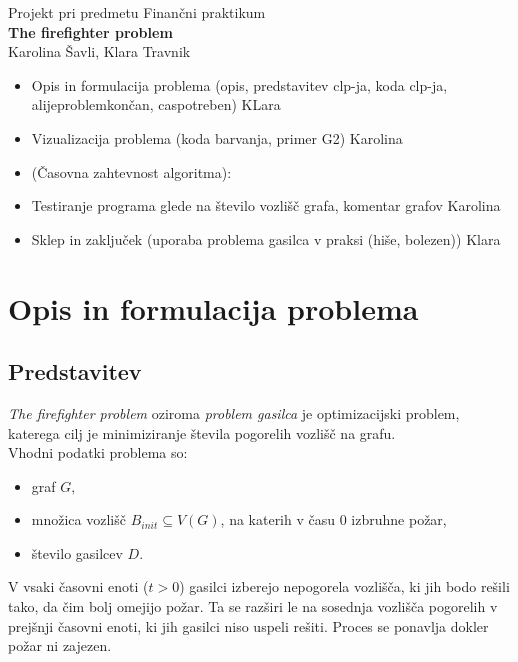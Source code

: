 \documentclass[a4paper, 12pt]{article}
\begin{document}
    
\thispagestyle{empty}
\vfill

\begin{center}{\large
Projekt pri predmetu Finančni praktikum\\[5mm]
{\Huge \bf The firefighter problem}\\[5mm]
Karolina Šavli, Klara Travnik\\[1cm]}
\end{center}
\vfill

\pagebreak


\tableofcontents

\pagebreak



\begin{itemize}
    \item Opis in formulacija problema (opis, predstavitev clp-ja, koda clp-ja, alijeproblemkončan, caspotreben) KLara
    \item Vizualizacija problema (koda barvanja, primer G2) Karolina
    \item (Časovna zahtevnost algoritma): 
    \item Testiranje programa glede na število vozlišč grafa, komentar grafov Karolina
    \item Sklep in zaključek (uporaba problema gasilca v praksi (hiše, bolezen)) Klara
\end{itemize}


\pagebreak

\section{Opis in formulacija problema}

\subsection{Predstavitev}
\noindent \emph{The firefighter problem} oziroma \emph{problem gasilca} je optimizacijski problem, katerega cilj je 
minimiziranje števila pogorelih vozlišč na grafu. \\
Vhodni podatki problema so:
\begin{itemize}
    \item graf $G,$
    \item množica vozlišč $B_{init} \subseteq V\left(G\right)$, na katerih v času $0$ izbruhne požar,
    \item število gasilcev $D$.
\end{itemize} 
V vsaki časovni enoti ($t > 0$) gasilci izberejo nepogorela vozlišča, ki jih bodo rešili tako,
da čim bolj omejijo požar. Ta se razširi le na sosednja vozlišča pogorelih v prejšnji časovni enoti,
ki jih gasilci niso uspeli rešiti. Proces se ponavlja dokler požar ni zajezen. \\
\end{document}
